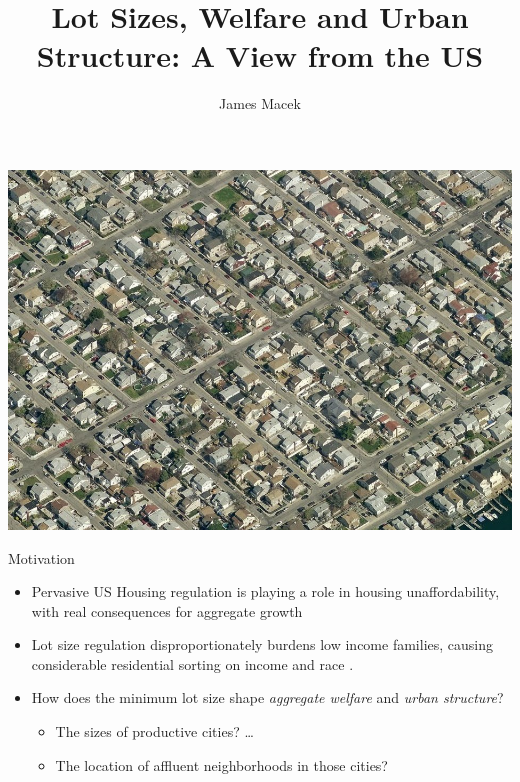 \documentclass{beamer}
\title{Lot Sizes, Welfare and Urban Structure: A View from the US}
\author{James Macek}
\begin{document}
\begin{frame}[plain]
    \maketitle
\end{frame}

\begin{frame}
	\includegraphics[width = \textwidth]{Gerritsen.jpg}
\end{frame}
\addtocounter{framenumber}{-1}


\begin{frame}{Motivation}
	\begin{itemize}
		\itemsep1em
		\color{black}
\item Pervasive US Housing regulation is playing a role in housing unaffordability, with real consequences for \color{red} aggregate growth \color{black} \citep{hseihmoretti} \citep{durantonpugaurbgrowth} \citep{parkho} \pause

\item Lot size regulation disproportionately burdens low income families, causing considerable \color{red} residential sorting on income \color{black} and race  \citep{kulka} \citep{Song}. \pause

\item How does the minimum lot size shape \textit{aggregate welfare} and \textit{urban structure}?
\begin{itemize}
	\item The sizes of productive cities? \dots 
	\item The location of affluent neighborhoods in those cities?
\end{itemize}


	\end{itemize}
\end{frame}
\end{document}
